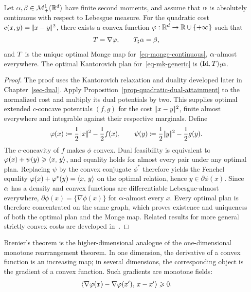\begin{thm}[Brenier]\label{thm-brenier}
	Let $\alpha,\beta\in\mathcal{M}_+^1(\mathbb{R}^d)$ have finite second moments, and assume that $\alpha$ is absolutely continuous with respect to Lebesgue measure. For the quadratic cost $c(x,y)=|\!| x-y |\!|^2$, there exists a convex function $\varphi:\mathbb{R}^d\to\mathbb{R}\cup\{+\infty\}$ such that
	\[
		T=\nabla\varphi,
		\qquad
		T_\sharp\alpha=\beta,
	\]
	and $T$ is the unique optimal Monge map for~\eqref{eq-monge-continuous}, $\alpha$-almost everywhere. The optimal Kantorovich plan for~\eqref{eq-mk-generic} is $(\mathrm{Id},T)_\sharp\alpha$.
\end{thm}
\begin{proof}
	The proof uses the Kantorovich relaxation and duality developed later in Chapter~\ref{sec-dual}. Apply Proposition~\ref{prop-quadratic-dual-attainment} to the normalized cost and multiply its dual potentials by two. This supplies optimal extended $c$-concave potentials $(f,g)$ for the cost $|\!| x-y |\!|^2$, finite almost everywhere and integrable against their respective marginals. Define
	\[
		\varphi(x)\coloneqq\frac12|\!| x |\!|^2-\frac12 f(x),
		\qquad
		\psi(y)\coloneqq\frac12|\!| y |\!|^2-\frac12 g(y).
	\]
	The $c$-concavity of $f$ makes $\phi$ convex. Dual feasibility is equivalent to $\varphi(x)+\psi(y)\geqslant\langle x,\,y\rangle$, and equality holds for almost every pair under any optimal plan. Replacing $\psi$ by the convex conjugate $\phi^*$ therefore yields the Fenchel equality $\varphi(x)+\varphi^*(y)=\langle x,\,y\rangle$ on the optimal relation, hence $y\in\partial\phi(x)$. Since $\alpha$ has a density and convex functions are differentiable Lebesgue-almost everywhere, $\partial\phi(x)=\{\nabla\phi(x)\}$ for $\alpha$-almost every $x$. Every optimal plan is therefore concentrated on the same graph, which proves existence and uniqueness of both the optimal plan and the Monge map. Related results for more general strictly convex costs are developed in~\cite{gangbo1996geometry,caffarelli2002constructing,Villani09}.
\end{proof}

Brenier's theorem is the higher-dimensional analogue of the one-dimensional monotone rearrangement theorem. In one dimension, the derivative of a convex function is an increasing map; in several dimensions, the corresponding object is the gradient of a convex function. Such gradients are monotone fields:
\[
	\langle \nabla\varphi(x)-\nabla\varphi(x'),\,x-x'\rangle\geqslant0.
\]

